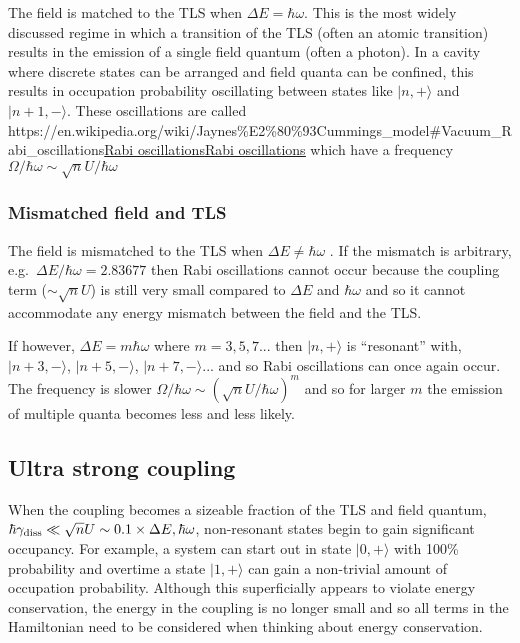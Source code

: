 \documentclass[
]{article}
\let\oldhref\href
\renewcommand{\href}[2]{\ifx#1\urlprefix\oldhref{#1}{#2}\else\uline{\oldhref{#1}{#2}}\fi}
\renewcommand{\[}{\begin{equation}}
\renewcommand{\]}{\end{equation}}
\begin{document}
The field is matched to the TLS when \(\Delta E = \hbar\omega\). This is
the most widely discussed regime in which a transition of the TLS (often
an atomic transition) results in the emission of a single field quantum
(often a photon). In a cavity where discrete states can be arranged and
field quanta can be confined, this results in occupation probability
oscillating between states like \(|n,+\rangle\) and \(|n+1,-\rangle\).
These oscillations are called
\href{https://en.wikipedia.org/wiki/Jaynes\%E2\%80\%93Cummings_model\#Vacuum_Rabi_oscillations}{Rabi
oscillations} which have a frequency
\(\Omega/\hbar\omega \sim \sqrt{n}U/\hbar\omega\)

\subsubsection{Mismatched field and TLS}\label{mismatched-field-and-tls}

The field is mismatched to the TLS when \(\Delta E \neq \hbar\omega\) .
If the mismatch is arbitrary, e.g.~\(\Delta E/ \hbar\omega = 2.83677\)
then Rabi oscillations cannot occur because the coupling term
(\(\sim \sqrt{n}U\)) is still very small compared to \(\Delta E\) and
\(\hbar\omega\) and so it cannot accommodate any energy mismatch between
the field and the TLS.

If however, \(\Delta E = m\hbar \omega\) where \(m=3, 5, 7 ...\) then
\(|n,+\rangle\) is ``resonant'' with, \(|n+3,-\rangle\),
\(|n+5,-\rangle\), \(|n+7,-\rangle ...\) and so Rabi oscillations can
once again occur. The frequency is slower
\(\Omega/\hbar\omega \sim (\sqrt{n}U/\hbar\omega)^m\) and so for larger
\(m\) the emission of multiple quanta becomes less and less likely.

\subsection{Ultra strong coupling}\label{ultra-strong-coupling-1}

When the coupling becomes a sizeable fraction of the TLS and field
quantum,
\(\hbar\gamma_{\rm diss} \ll \sqrt{n}U \sim 0.1 \times \Delta E , \hbar \omega\),
non-resonant states begin to gain significant occupancy. For example, a
system can start out in state \(|0,+\rangle\) with 100\% probability and
overtime a state \(|1,+\rangle\) can gain a non-trivial amount of
occupation probability. Although this superficially appears to violate
energy conservation, the energy in the coupling is no longer small and
so all terms in the Hamiltonian need to be considered when thinking
about energy conservation.
\end{document}
